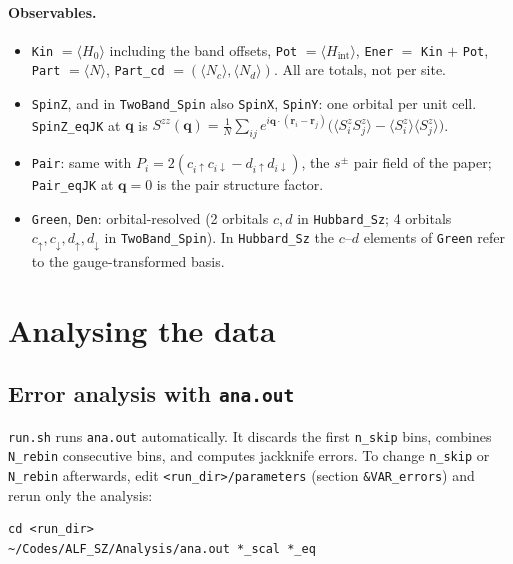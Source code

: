 \documentclass[11pt,a4paper]{article}
\newcommand{\f}[1]{\texttt{#1}}          %
\begin{document}
\paragraph{Observables.}
\begin{itemize}
  \item \f{Kin} $=\langle H_0\rangle$ including the band offsets, \f{Pot} $=\langle H_\text{int}\rangle$,
        \f{Ener} $=$ \f{Kin} $+$ \f{Pot}, \f{Part} $=\langle N\rangle$,
        \f{Part\_cd} $=(\langle N_c\rangle,\langle N_d\rangle)$. All are totals, not per site.
  \item \f{SpinZ}, and in \f{TwoBand\_Spin} also \f{SpinX}, \f{SpinY}: one orbital per unit cell.
        \f{SpinZ\_eqJK} at $\mathbf q$ is
        $S^{zz}(\mathbf q)=\frac1N\sum_{ij}e^{i\mathbf q\cdot(\mathbf r_i-\mathbf r_j)}
        \bigl(\langle S^z_iS^z_j\rangle-\langle S^z_i\rangle\langle S^z_j\rangle\bigr)$.
  \item \f{Pair}: same with $P_i=2(c_{i\uparrow}c_{i\downarrow}-d_{i\uparrow}d_{i\downarrow})$,
        the $s^{\pm}$ pair field of the paper; \f{Pair\_eqJK} at $\mathbf q=0$ is the pair
        structure factor.
  \item \f{Green}, \f{Den}: orbital-resolved (2 orbitals $c,d$ in \f{Hubbard\_Sz}; 4 orbitals
        $c_\uparrow,c_\downarrow,d_\uparrow,d_\downarrow$ in \f{TwoBand\_Spin}). In
        \f{Hubbard\_Sz} the $c$--$d$ elements of \f{Green} refer to the gauge-transformed basis.
\end{itemize}

\section{Analysing the data}
\label{sec:analysis}

\subsection{Error analysis with \texorpdfstring{\texttt{ana.out}}{ana.out}}
\f{run.sh} runs \f{ana.out} automatically. It discards the first \f{n\_skip} bins,
combines \f{N\_rebin} consecutive bins, and computes jackknife errors. To change \f{n\_skip}
or \f{N\_rebin} afterwards, edit \f{<run\_dir>/parameters} (section \f{\&VAR\_errors}) and rerun
only the analysis:
\begin{lstlisting}
cd <run_dir>
~/Codes/ALF_SZ/Analysis/ana.out *_scal *_eq
\end{lstlisting}
\end{document}
